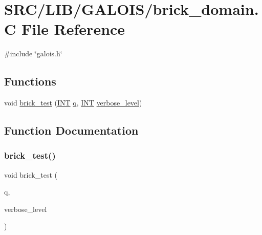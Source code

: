 \hypertarget{brick__domain_8_c}{}\section{S\+R\+C/\+L\+I\+B/\+G\+A\+L\+O\+I\+S/brick\+\_\+domain.C File Reference}
\label{brick__domain_8_c}
{\ttfamily \#include \char`\"{}galois.\+h\char`\"{}}\newline
\subsection*{Functions}
\begin{DoxyCompactItemize}
\item 
void \mbox{\hyperlink{brick__domain_8_c_a6d5f2c67a753700c437c5cce9db5df8a}{brick\+\_\+test}} (\mbox{\hyperlink{galois_8h_a09fddde158a3a20bd2dcadb609de11dc}{I\+NT}} \mbox{\hyperlink{simeon_8_c_a92cbb483a3b27ae1a0dbfcb125ce216f}{q}}, \mbox{\hyperlink{galois_8h_a09fddde158a3a20bd2dcadb609de11dc}{I\+NT}} \mbox{\hyperlink{simeon_8_c_a818073fbcc2f439e7c56952f67386122}{verbose\+\_\+level}})
\end{DoxyCompactItemize}


\subsection{Function Documentation}
\mbox{\label{brick__domain_8_c_a6d5f2c67a753700c437c5cce9db5df8a}} 
\subsubsection{\texorpdfstring{brick\+\_\+test()}{brick\_test()}}
{\footnotesize\ttfamily void brick\+\_\+test (\begin{DoxyParamCaption}\item[{\mbox{\hyperlink{galois_8h_a09fddde158a3a20bd2dcadb609de11dc}{I\+NT}}}]{q,  }\item[{\mbox{\hyperlink{galois_8h_a09fddde158a3a20bd2dcadb609de11dc}{I\+NT}}}]{verbose\+\_\+level }\end{DoxyParamCaption})}

